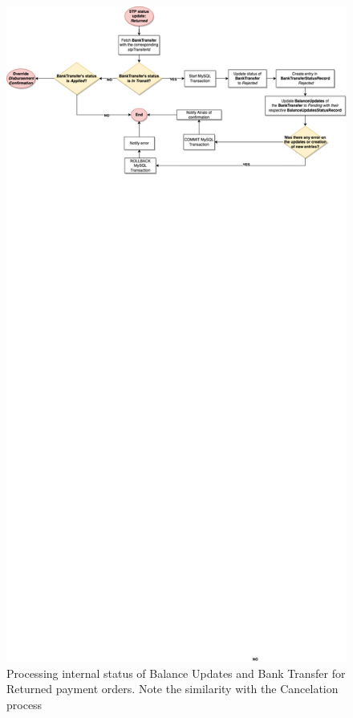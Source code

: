 \begin{figure} [h]
    \centering
    \includegraphics[scale = 0.4]{assets/diagrams/ReturnedStatusUpdate.png}
    \caption{Processing internal status of Balance Updates and Bank Transfer for Returned payment orders. Note the similarity with the Cancelation process}\label{fig:returned_status_update}
\end{figure}
